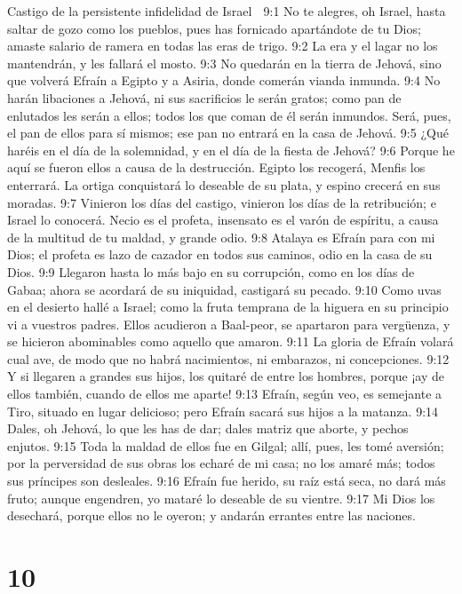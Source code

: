 Castigo de la persistente infidelidad de Israel  

9:1 No te alegres, oh Israel, hasta saltar de gozo como los pueblos, pues has fornicado apartándote de tu Dios; amaste salario de ramera en todas las eras de trigo.  
9:2 La era y el lagar no los mantendrán, y les fallará el mosto.  
9:3 No quedarán en la tierra de Jehová, sino que volverá Efraín a Egipto y a Asiria, donde comerán vianda inmunda.  
9:4 No harán libaciones a Jehová, ni sus sacrificios le serán gratos; como pan de enlutados les serán a ellos; todos los que coman de él serán inmundos. Será, pues, el pan de ellos para sí mismos; ese pan no entrará en la casa de Jehová.  
9:5 ¿Qué haréis en el día de la solemnidad, y en el día de la fiesta de Jehová?  
9:6 Porque he aquí se fueron ellos a causa de la destrucción. Egipto los recogerá, Menfis los enterrará. La ortiga conquistará lo deseable de su plata, y espino crecerá en sus moradas.  
9:7 Vinieron los días del castigo, vinieron los días de la retribución; e Israel lo conocerá. Necio es el profeta, insensato es el varón de espíritu, a causa de la multitud de tu maldad, y grande odio.  
9:8 Atalaya es Efraín para con mi Dios; el profeta es lazo de cazador en todos sus caminos, odio en la casa de su Dios.  
9:9 Llegaron hasta lo más bajo en su corrupción, como en los días de Gabaa; ahora se acordará de su iniquidad, castigará su pecado.  
9:10 Como uvas en el desierto hallé a Israel; como la fruta temprana de la higuera en su principio vi a vuestros padres. Ellos acudieron a Baal-peor, se apartaron para vergüenza, y se hicieron abominables como aquello que amaron.  
9:11 La gloria de Efraín volará cual ave, de modo que no habrá nacimientos, ni embarazos, ni concepciones.  
9:12 Y si llegaren a grandes sus hijos, los quitaré de entre los hombres, porque ¡ay de ellos también, cuando de ellos me aparte!  
9:13 Efraín, según veo, es semejante a Tiro, situado en lugar delicioso; pero Efraín sacará sus hijos a la matanza.  
9:14 Dales, oh Jehová, lo que les has de dar; dales matriz que aborte, y pechos enjutos.  
9:15 Toda la maldad de ellos fue en Gilgal; allí, pues, les tomé aversión; por la perversidad de sus obras los echaré de mi casa; no los amaré más; todos sus príncipes son desleales.  
9:16 Efraín fue herido, su raíz está seca, no dará más fruto; aunque engendren, yo mataré lo deseable de su vientre.  
9:17 Mi Dios los desechará, porque ellos no le oyeron; y andarán errantes entre las naciones.  

\chapter{10}

